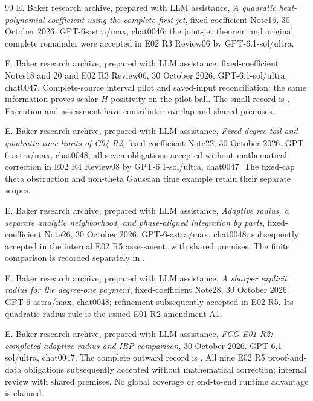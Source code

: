 \documentclass[11pt]{article}
\numberwithin{equation}{section}
\begin{document}
\begin{thebibliography}{99}
E. Baker research archive, prepared with LLM assistance,
\emph{A quadratic heat-polynomial coefficient using the complete first jet},
fixed-coefficient Note16, 30 October 2026.
GPT-6-astra/max, chat0046; the joint-jet theorem and original complete
remainder were accepted in E02 R3 Review06 by GPT-6.1-sol/ultra.

E. Baker research archive, prepared with LLM assistance,
fixed-coefficient Notes18 and 20 and E02 R3 Review06,
30 October 2026. GPT-6.1-sol/ultra, chat0047.
Complete-source interval pilot and saved-input reconciliation;
the same information proves scalar $H$ positivity on the pilot ball.
The small record is
.
Execution and assessment have contributor overlap and shared premises.

E. Baker research archive, prepared with LLM assistance,
\emph{Fixed-degree tail and quadratic-time limits of C04 R2},
fixed-coefficient Note22, 30 October 2026.
GPT-6-astra/max, chat0048; all seven obligations accepted without
mathematical correction in E02 R4 Review08 by GPT-6.1-sol/ultra,
chat0047. The fixed-cap theta obstruction and non-theta Gaussian
time example retain their separate scopes.

E. Baker research archive, prepared with LLM assistance,
\emph{Adaptive radius, a separate analytic neighborhood, and
phase-aligned integration by parts}, fixed-coefficient Note26,
30 October 2026. GPT-6-astra/max, chat0048; subsequently accepted in the internal
E02 R5 assessment, with shared premises. The finite comparison is recorded
separately in \cite{FCGAdaptiveComparison}.

E. Baker research archive, prepared with LLM assistance,
\emph{A sharper explicit radius for the degree-one payment},
fixed-coefficient Note28, 30 October 2026.
GPT-6-astra/max, chat0048; refinement subsequently accepted in
E02 R5. Its quadratic radius rule is the issued E01 R2 amendment A1.

E. Baker research archive, prepared with LLM assistance,
\emph{FCG-E01 R2: completed adaptive-radius and IBP comparison},
30 October 2026. GPT-6.1-sol/ultra, chat0047.
The complete outward record is
.
All nine E02 R5 proof-and-data obligations subsequently accepted
without mathematical correction; internal review with shared premises.
No global coverage
or end-to-end runtime advantage is claimed.


\end{thebibliography}
\end{document}
